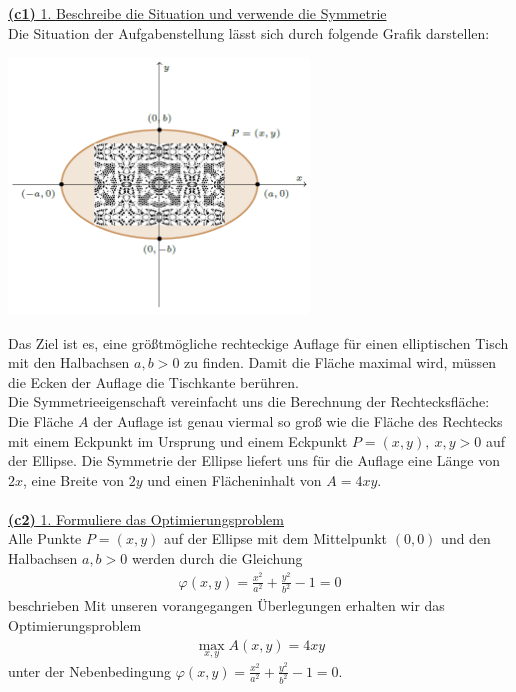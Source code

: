 \underline{\textbf{(c1)} 1. Beschreibe die Situation und verwende die Symmetrie}\\
Die Situation der Aufgabenstellung lässt sich durch folgende Grafik darstellen:
\begin{center}
	\includegraphics[width=0.6\textwidth]{pictures/aufgabe1_c}
\end{center}
Das Ziel ist es, eine größtmögliche rechteckige Auflage für einen elliptischen Tisch mit den Halbachsen $ a,b > 0  $ zu finden. Damit die Fläche maximal wird, müssen die Ecken der Auflage die Tischkante berühren.\\
Die Symmetrieeigenschaft vereinfacht uns die Berechnung der Rechtecksfläche:\\
Die Fläche $ A $ der Auflage ist genau viermal so groß wie die Fläche des Rechtecks mit einem Eckpunkt im Ursprung und einem Eckpunkt $ P = (x,y), \ x,y > 0  $ auf der Ellipse. Die Symmetrie der Ellipse liefert uns für die Auflage eine Länge von $ 2x $, eine Breite von $ 2y $ und einen Flächeninhalt von $ A = 4 xy $.\\
\\
\newpage
\underline{\textbf{(c2)} 1. Formuliere das Optimierungsproblem}\\
Alle Punkte $ P=(x,y) $ auf der Ellipse mit dem Mittelpunkt $ (0,0) $ und den Halbachsen $ a,b > 0 $ werden durch die Gleichung
\begin{align*}
	\varphi(x,y) = \frac{x^2}{a^2} + \frac{y^2}{b^2} - 1 = 0
\end{align*} 
beschrieben
Mit unseren vorangegangen Überlegungen erhalten wir das Optimierungsproblem
\begin{align*}
	\max \limits_{x,y} A(x,y) = 4 xy
\end{align*}
unter der Nebenbedingung $ \varphi(x,y) = \frac{x^2}{a^2} + \frac{y^2}{b^2} - 1 = 0 $.\\
\\
